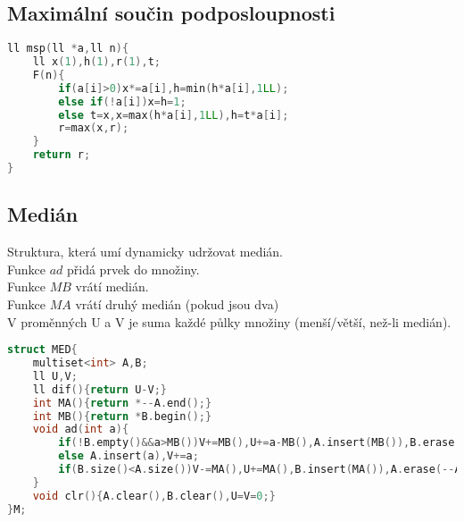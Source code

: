 \documentclass[11pt]{article}
\begin{document}
\subsection{Maximální součin podposloupnosti}
\begin{lstlisting}[language=C++]
ll msp(ll *a,ll n){
    ll x(1),h(1),r(1),t;
    F(n){
        if(a[i]>0)x*=a[i],h=min(h*a[i],1LL);
        else if(!a[i])x=h=1;
        else t=x,x=max(h*a[i],1LL),h=t*a[i];
        r=max(x,r);
    }
    return r;
}
\end{lstlisting}
\subsection{Medián}
Struktura, která umí dynamicky udržovat medián.
\\Funkce $ad$ přidá prvek do množiny.
\\Funkce $MB$ vrátí medián.
\\Funkce $MA$ vrátí druhý medián (pokud jsou dva)
\\V proměnných \textsf{U} a \textsf{V} je suma každé půlky množiny (menší/větší, než-li medián).
\begin{lstlisting}[language=C++]
struct MED{
    multiset<int> A,B;
    ll U,V;
    ll dif(){return U-V;}
    int MA(){return *--A.end();}
    int MB(){return *B.begin();}
    void ad(int a){
        if(!B.empty()&&a>MB())V+=MB(),U+=a-MB(),A.insert(MB()),B.erase(B.begin()),B.insert(a);
        else A.insert(a),V+=a;
        if(B.size()<A.size())V-=MA(),U+=MA(),B.insert(MA()),A.erase(--A.end());
    }
    void clr(){A.clear(),B.clear(),U=V=0;}
}M;
\end{lstlisting}
\end{document}
